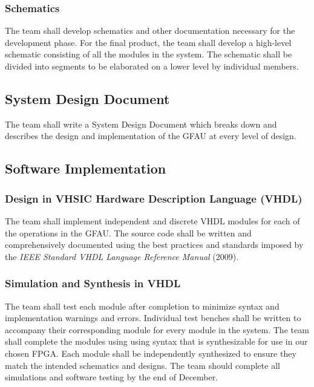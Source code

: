 \documentclass[12pt]{extarticle}
\begin{document}
            \subsubsection{Schematics} The team shall develop 
            schematics and other documentation necessary for the development
            phase. For the final product, the team shall develop a high-level
            schematic consisting of all the modules in the system. The
            schematic shall be divided into segments to be elaborated on a
            lower level by individual members.
            
            \subsection{System Design Document} The team shall write a System
            Design Document which breaks down and describes the design and
            implementation of the GFAU at every level of design.

        \subsection{Software Implementation}

            \subsubsection{Design in VHSIC Hardware Description Language
            (VHDL)} The team shall implement independent and discrete VHDL
            modules for each of the operations in the GFAU. The source
            code shall be written and comprehensively documented using the best
            practices and standards imposed by the \textit{IEEE Standard VHDL
            Language Reference Manual} (2009).

            \subsubsection{Simulation and Synthesis in VHDL} The team shall
            test each module after completion to minimize syntax and
            implementation warnings and errors. Individual test benches shall be
            written to accompany their corresponding module for every module in
            the system. The team shall complete the modules using using syntax
            that is synthesizable for use in our chosen FPGA. Each module shall
            be independently synthesized to ensure they match the intended
            schematics and designs. The team should complete all simulations and
            software testing by the end of December.
\end{document}
